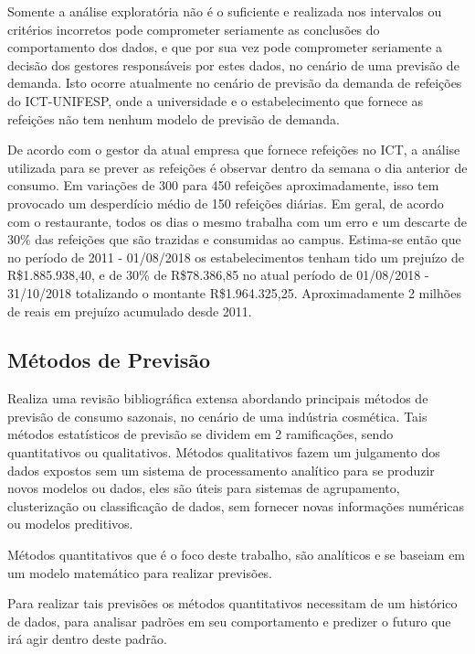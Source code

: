 \documentclass[	12pt, Times, openright, twoside, a4paper, english, brazil]{abntex2}
\begin{document}
          Somente a análise exploratória não é o suficiente e realizada nos intervalos ou critérios incorretos pode comprometer seriamente as conclusões do comportamento dos dados, e que por sua vez pode comprometer seriamente a decisão dos gestores responsáveis por estes dados, no cenário de uma previsão de demanda. 
          Isto ocorre atualmente no cenário de previsão da demanda de refeições do ICT-UNIFESP, onde a universidade e o estabelecimento que fornece as refeições não tem nenhum modelo de previsão de demanda. 

          De acordo com o gestor da atual empresa que fornece refeições no ICT, a análise utilizada para se prever as refeições é observar dentro da semana o dia anterior de consumo. Em variações de 300 para 450 refeições aproximadamente, isso tem provocado um desperdício médio de 150 refeições diárias. Em geral, de acordo com o restaurante, todos os dias o mesmo trabalha com um erro e um descarte de 30\% das refeições que são trazidas e consumidas ao campus. Estima-se então que no período de 2011 - 01/08/2018 os estabelecimentos tenham tido um prejuízo de R\$1.885.938,40, e de 30\% de R\$78.386,85 no atual período de 01/08/2018 - 31/10/2018 totalizando o montante  R\$1.964.325,25. Aproximadamente 2 milhões de reais em prejuízo acumulado desde 2011.

        \subsection{Métodos de Previsão} 

          \cite{Junior2007} Realiza uma revisão bibliográfica extensa abordando principais métodos de previsão de consumo sazonais, no cenário de uma indústria cosmética. Tais métodos estatísticos de previsão se dividem em 2 ramificações, sendo quantitativos ou qualitativos. Métodos qualitativos fazem um julgamento dos dados expostos sem um sistema de processamento analítico para se produzir novos modelos ou dados, eles são úteis para sistemas de agrupamento, clusterização ou classificação de dados, sem fornecer novas informações numéricas ou modelos preditivos.

          Métodos quantitativos que é o foco deste trabalho, são analíticos e se baseiam em um modelo matemático para realizar previsões. 

          Para realizar tais previsões os métodos quantitativos necessitam de um histórico de dados, para analisar padrões em seu comportamento e predizer o futuro que irá agir dentro deste padrão.
\end{document}
